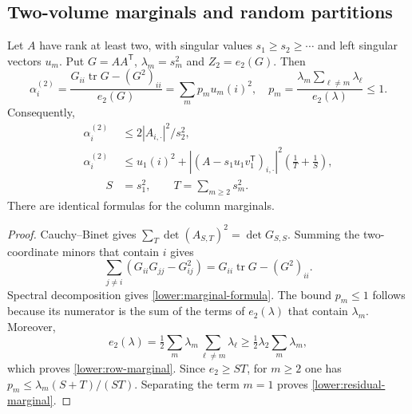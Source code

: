 \subsection{Two-volume marginals and random partitions}

\begin{lemma}\label{lower:two-marginals}
Let $A$ have rank at least two, with singular values
$s_1\geq s_2\geq\cdots$ and left singular vectors $u_m$.
Put $G=AA^{\mathsf T}$, $\lambda_m=s_m^2$ and $Z_2=e_2(G)$.
Then
\begin{equation}\label{lower:marginal-formula}
 \alpha_i^{(2)}
 =\frac{G_{ii}\operatorname{tr}G-(G^2)_{ii}}{e_2(G)}
 =\sum_m p_m u_m(i)^2,
 \quad
 p_m=\frac{\lambda_m\sum_{\ell\ne m}\lambda_\ell}{e_2(\lambda)}
 \leq1.
\end{equation}
Consequently,
\begin{align}
 \alpha_i^{(2)}&\leq2|A_{i,\cdot}|^2/s_2^2,
                          \label{lower:row-marginal}\\
 \alpha_i^{(2)}&\leq u_1(i)^2+
 |(A-s_1u_1v_1^{\mathsf T})_{i,\cdot}|^2
 \left(\frac1T+\frac1S\right),
                          \label{lower:residual-marginal}\\
 \qquad S&=s_1^2,\qquad T=\sum_{m\geq2}s_m^2.
 \nonumber
\end{align}
There are identical formulas for the column marginals.
\end{lemma}
\begin{proof}
Cauchy--Binet gives
$\sum_T\det(A_{S,T})^2=\det G_{S,S}$.
Summing the two-coordinate minors that contain $i$ gives
\[
 \sum_{j\ne i}(G_{ii}G_{jj}-G_{ij}^2)
 =G_{ii}\operatorname{tr}G-(G^2)_{ii}.
\]
Spectral decomposition gives \eqref{lower:marginal-formula}.
The bound $p_m\leq1$ follows because its numerator is the sum of
the terms of $e_2(\lambda)$ that contain $\lambda_m$.
Moreover,
\[
 e_2(\lambda)=\tfrac12\sum_m\lambda_m
                         \sum_{\ell\ne m}\lambda_\ell
 \geq\tfrac12\lambda_2\sum_m\lambda_m,
\]
which proves \eqref{lower:row-marginal}.  Since $e_2\geq ST$,
for $m\geq2$ one has $p_m\leq\lambda_m(S+T)/(ST)$.
Separating the term $m=1$ proves \eqref{lower:residual-marginal}.
\end{proof}

